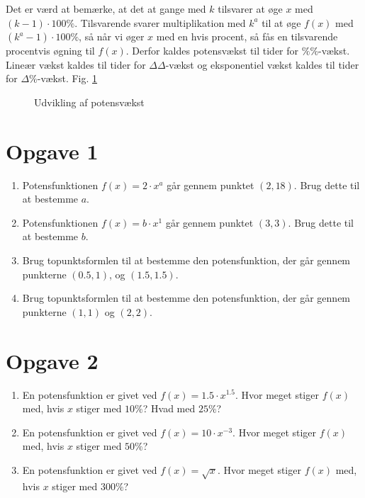 Det er værd at bemærke, at det at gange med $k$ tilsvarer at øge $x$ med $(k-1)\cdot 100 \%.$ Tilsvarende svarer multiplikation med $k^a$ til at øge $f(x)$ med $(k^a-1)\cdot 100\%$, så når vi øger $x$ med en hvis procent, så fås en tilsvarende procentvis øgning til $f(x)$. Derfor kaldes potensvækst til tider for $\%\%$-vækst. Lineær vækst kaldes til tider for $\Delta\Delta$-vækst og eksponentiel vækst kaldes til tider for $\Delta\%$-vækst. Fig. \ref{fig:potens}
\begin{figure}[H]
\centering
{}
\caption{Udvikling af potensvækst}
\label{fig:potens}
\end{figure}
\section*{Opgave 1}
\begin{enumerate}[label=\roman*)]
\item Potensfunktionen $f(x) = 2\cdot x^a$ går gennem punktet $(2,18)$. Brug dette til at bestemme $a$.
\item Potensfunktionen $f(x) = b\cdot x^1$ går gennem punktet $(3,3)$. Brug dette til at bestemme $b$.
\item Brug topunktsformlen til at bestemme den potensfunktion, der går gennem punkterne $(0.5,1)$, og $(1.5,1.5)$.
\item Brug topunktsformlen til at bestemme den potensfunktion, der går gennem punkterne $(1,1)$ og $(2,2)$.
\end{enumerate}
\section*{Opgave 2}
\begin{enumerate}
\item En potensfunktion er givet ved $f(x) = 1.5\cdot x^{1.5}$. Hvor meget stiger $f(x)$ med, hvis $x$ stiger med $10\%$? Hvad med $25\%$?
\item En potensfunktion er givet ved $f(x) = 10\cdot x^{-3}$. Hvor meget stiger $f(x)$ med, hvis $x$ stiger med $50\%$?
\item En potensfunktion er givet ved $f(x) = \sqrt{x}$. Hvor meget stiger $f(x)$ med, hvis $x$ stiger med $300\%$?
\end{enumerate}
